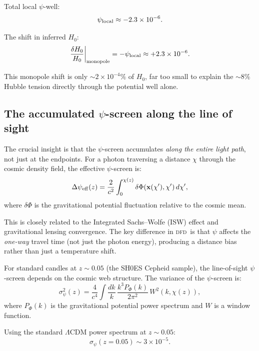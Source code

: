 \documentclass[aps,prl,twocolumn,superscriptaddress,showpacs]{revtex4-2}
\newcommand{\DFD}{\textsc{dfd}}
\begin{document}
Total local $\psi$-well:
\begin{equation}
\psi_{\rm local} \approx -2.3\times 10^{-6}.
\label{eq:psi_local}
\end{equation}

The shift in inferred $H_0$:
\begin{equation}
\frac{\delta H_0}{H_0}\bigg|_{\rm monopole}
= -\psi_{\rm local}
\approx +2.3\times 10^{-6}.
\label{eq:H0_monopole_psi}
\end{equation}

This monopole shift is only $\sim 2\times 10^{-4}\%$ of $H_0$,
far too small to explain the $\sim 8\%$ Hubble tension directly
through the potential well alone.

\subsection{The accumulated $\psi$-screen along the line of sight}

The crucial insight is that the $\psi$-screen accumulates
\emph{along the entire light path}, not just at the endpoints.
For a photon traversing a distance $\chi$ through the cosmic
density field, the effective $\psi$-screen is:
\begin{equation}
\Delta\psi_{\rm eff}(z) = \frac{2}{c^2}\int_0^{\chi(z)}
\delta\Phi(\mathbf{x}(\chi'),\chi')\,d\chi',
\end{equation}
where $\delta\Phi$ is the gravitational potential fluctuation
relative to the cosmic mean.

This is closely related to the Integrated Sachs--Wolfe (ISW)
effect and gravitational lensing convergence.  The key difference
in \DFD\ is that $\psi$ affects the \emph{one-way} travel time
(not just the photon energy), producing a distance bias rather
than just a temperature shift.

For standard candles at $z \sim 0.05$ (the SH0ES Cepheid sample),
the line-of-sight $\psi$-screen depends on the cosmic web
structure.  The variance of the $\psi$-screen is:
\begin{equation}
\sigma_\psi^2(z) = \frac{4}{c^4}\int \frac{dk}{k}\,
\frac{k^3 P_\Phi(k)}{2\pi^2}\,W^2(k,\chi(z)),
\end{equation}
where $P_\Phi(k)$ is the gravitational potential power spectrum
and $W$ is a window function.

Using the standard $\Lambda$CDM power spectrum at $z \sim 0.05$:
\begin{equation}
\sigma_\psi(z = 0.05) \sim 3\times 10^{-5}.
\end{equation}
\end{document}
